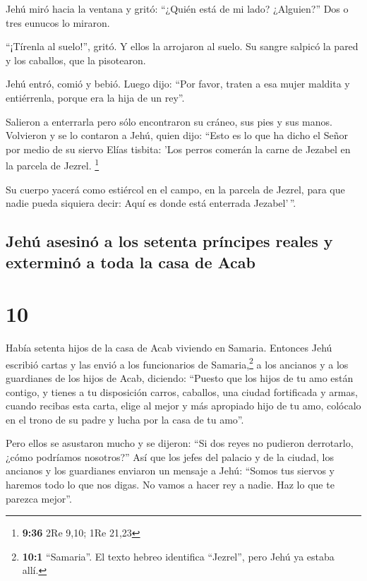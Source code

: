  Jehú miró hacia la ventana y gritó: ``¿Quién está de mi
lado? ¿Alguien?'' Dos o tres eunucos lo miraron.

 ``¡Tírenla al suelo!'', gritó. Y ellos la arrojaron al
suelo. Su sangre salpicó la pared y los caballos, que la pisotearon.

 Jehú entró, comió y bebió. Luego dijo: ``Por favor,
traten a esa mujer maldita y entiérrenla, porque era la hija de un
rey''.

 Salieron a enterrarla pero sólo encontraron su cráneo,
sus pies y sus manos.  Volvieron y se lo contaron a Jehú,
quien dijo: ``Esto es lo que ha dicho el Señor por medio de su siervo
Elías tisbita: 'Los perros comerán la carne de Jezabel en la parcela de
Jezrel. \footnote{\textbf{9:36} 2Re 9,10; 1Re 21,23}

 Su cuerpo yacerá como estiércol en el campo, en la
parcela de Jezrel, para que nadie pueda siquiera decir: Aquí es donde
está enterrada Jezabel'\,''.

\hypertarget{jehuxfa-asesinuxf3-a-los-setenta-pruxedncipes-reales-y-exterminuxf3-a-toda-la-casa-de-acab}{%
\subsection{Jehú asesinó a los setenta príncipes reales y exterminó a
toda la casa de
Acab}\label{jehuxfa-asesinuxf3-a-los-setenta-pruxedncipes-reales-y-exterminuxf3-a-toda-la-casa-de-acab}}

\hypertarget{section-9}{%
\section{10}\label{section-9}}

 Había setenta hijos de la casa de Acab viviendo en
Samaria. Entonces Jehú escribió cartas y las envió a los funcionarios de
Samaria,\footnote{\textbf{10:1} ``Samaria''. El texto hebreo identifica
  ``Jezrel'', pero Jehú ya estaba allí.} a los ancianos y a los
guardianes de los hijos de Acab, diciendo:  ``Puesto que
los hijos de tu amo están contigo, y tienes a tu disposición carros,
caballos, una ciudad fortificada y armas, cuando recibas esta carta,
 elige al mejor y más apropiado hijo de tu amo, colócalo
en el trono de su padre y lucha por la casa de tu amo''.

 Pero ellos se asustaron mucho y se dijeron: ``Si dos
reyes no pudieron derrotarlo, ¿cómo podríamos nosotros?'' 
Así que los jefes del palacio y de la ciudad, los ancianos y los
guardianes enviaron un mensaje a Jehú: ``Somos tus siervos y haremos
todo lo que nos digas. No vamos a hacer rey a nadie. Haz lo que te
parezca mejor''.

